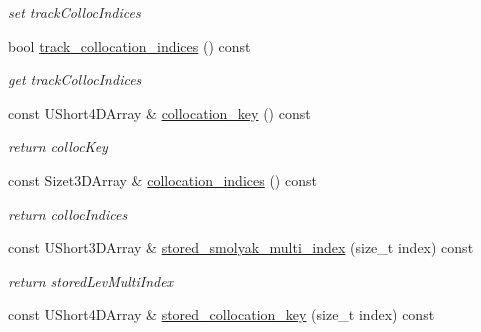 \begin{DoxyCompactItemize}
\begin{DoxyCompactList}\small\item\em set track\+Colloc\+Indices \end{DoxyCompactList}\item 
bool \hyperlink{classPecos_1_1HierarchSparseGridDriver_a7d9947e97cdab5d7f3e1855e663a020d}{track\+\_\+collocation\+\_\+indices} () const \label{classPecos_1_1HierarchSparseGridDriver_a7d9947e97cdab5d7f3e1855e663a020d}

\begin{DoxyCompactList}\small\item\em get track\+Colloc\+Indices \end{DoxyCompactList}\item 
const U\+Short4\+D\+Array \& \hyperlink{classPecos_1_1HierarchSparseGridDriver_a36d15989b38fc5460654d6ce1c605998}{collocation\+\_\+key} () const \label{classPecos_1_1HierarchSparseGridDriver_a36d15989b38fc5460654d6ce1c605998}

\begin{DoxyCompactList}\small\item\em return colloc\+Key \end{DoxyCompactList}\item 
const Sizet3\+D\+Array \& \hyperlink{classPecos_1_1HierarchSparseGridDriver_a2422d7adf5fccacbc664189508f03022}{collocation\+\_\+indices} () const \label{classPecos_1_1HierarchSparseGridDriver_a2422d7adf5fccacbc664189508f03022}

\begin{DoxyCompactList}\small\item\em return colloc\+Indices \end{DoxyCompactList}\item 
const U\+Short3\+D\+Array \& \hyperlink{classPecos_1_1HierarchSparseGridDriver_a4477fb6676f396ab83aa198fe0331bea}{stored\+\_\+smolyak\+\_\+multi\+\_\+index} (size\+\_\+t index) const \label{classPecos_1_1HierarchSparseGridDriver_a4477fb6676f396ab83aa198fe0331bea}

\begin{DoxyCompactList}\small\item\em return stored\+Lev\+Multi\+Index \end{DoxyCompactList}\item 
const U\+Short4\+D\+Array \& \hyperlink{classPecos_1_1HierarchSparseGridDriver_a03ca3eb80aa3d844b7da9253cf2a2cca}{stored\+\_\+collocation\+\_\+key} (size\+\_\+t index) const \label{classPecos_1_1HierarchSparseGridDriver_a03ca3eb80aa3d844b7da9253cf2a2cca}


\end{DoxyCompactItemize}
